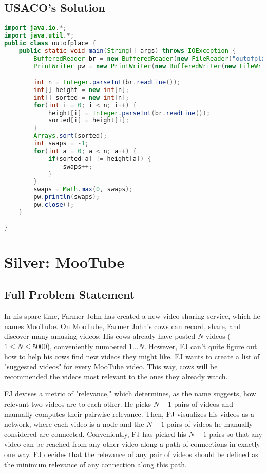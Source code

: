 \documentclass{article}
\begin{document}
\subsection{USACO's Solution}
\begin{lstlisting}[language=Java, caption="Java solution by USACO"]
import java.io.*;
import java.util.*;
public class outofplace {
	public static void main(String[] args) throws IOException {
		BufferedReader br = new BufferedReader(new FileReader("outofplace.in"));
		PrintWriter pw = new PrintWriter(new BufferedWriter(new FileWriter("outofplace.out")));

		int n = Integer.parseInt(br.readLine());
		int[] height = new int[n];
		int[] sorted = new int[n];
		for(int i = 0; i < n; i++) {
			height[i] = Integer.parseInt(br.readLine());
			sorted[i] = height[i];
		}
		Arrays.sort(sorted);
		int swaps = -1;
		for(int a = 0; a < n; a++) {
			if(sorted[a] != height[a]) {
				swaps++;
			}
		}
		swaps = Math.max(0, swaps);
		pw.println(swaps);
		pw.close();
	}
	
}
\end{lstlisting}

\section{Silver: MooTube}
\subsection{Full Problem Statement}
In his spare time, Farmer John has created a new video-sharing service, which he names MooTube. On MooTube, Farmer John's cows can record, share, and discover many amusing videos. His cows already have posted $N$ videos ($1 \leq N \leq 5000$), conveniently numbered $1 \ldots N$. However, FJ can't quite figure out how to help his cows find new videos they might like.
FJ wants to create a list of "suggested videos" for every MooTube video. This way, cows will be recommended the videos most relevant to the ones they already watch.

FJ devises a metric of "relevance," which determines, as the name suggests, how relevant two videos are to each other. He picks $N-1$ pairs of videos and manually computes their pairwise relevance. Then, FJ visualizes his videos as a network, where each video is a node and the $N-1$ pairs of videos he manually considered are connected. Conveniently, FJ has picked his $N-1$ pairs so that any video can be reached from any other video along a path of connections in exactly one way. FJ decides that the relevance of any pair of videos should be defined as the minimum relevance of any connection along this path.
\end{document}

